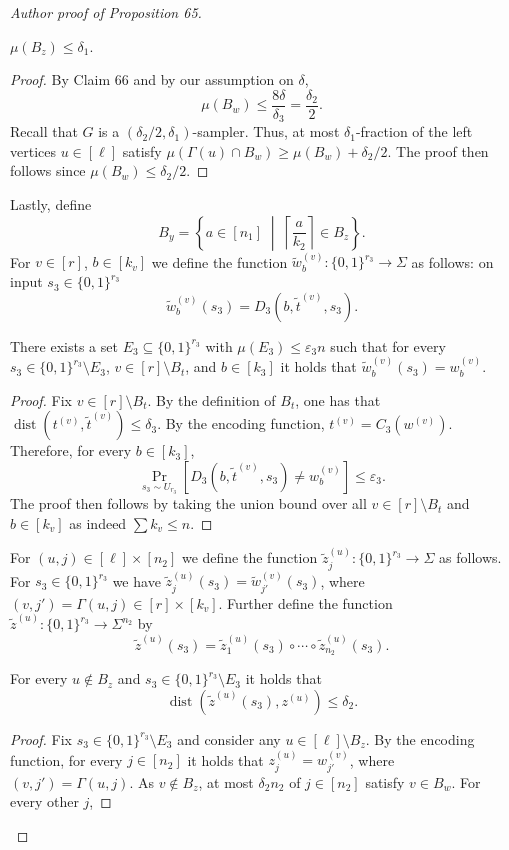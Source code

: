 \begin{proof}[Author proof of Proposition 65]
\begin{ntclaim} $\mu(B_z)\leq\delta_1$.\end{ntclaim}
\begin{proof}
By Claim 66 and by our assumption on $\delta$,
\[\mu(B_w)\leq\frac{8\delta}{\delta_3}=\frac{\delta_2}{2}.\]
Recall that $G$ is a $(\delta_2/2,\delta_1)$-sampler. Thus, at most $\delta_1$-fraction of the left vertices $u\in[\ell]$ satisfy $\mu(\Gamma(u)\cap B_w)\geq\mu(B_w)+\delta_2/2$. The proof then follows since $\mu(B_w)\leq\delta_2/2$.
\end{proof}
Lastly, define
\[B_y=\left\{a\in[n_1]\;\middle|\;\left\lceil\frac a{k_2}\right\rceil\in B_z\right\}.\]
For $v\in[r]$, $b\in[k_v]$ we define the function $\widetilde w_b^{(v)}:\{0,1\}^{r_3}\to\Sigma$ as follows: on input $s_3\in\{0,1\}^{r_3}$
\[\widetilde w_b^{(v)}(s_3)=D_3(b,\widetilde t^{(v)},s_3).\]
\begin{ntclaim}
There exists a set $E_3\subseteq\{0,1\}^{r_3}$ with $\mu(E_3)\leq\varepsilon_3n$ such that for every $s_3\in\{0,1\}^{r_3}\setminus E_3$, $v\in[r]\setminus B_t$, and $b\in[k_3]$ it holds that $\widetilde w_b^{(v)}(s_3)=w_b^{(v)}$.
\end{ntclaim}
\begin{proof}
Fix $v\in[r]\setminus B_t$. By the definition of $B_t$, one has that $\operatorname{dist}(t^{(v)},\widetilde t^{(v)})\leq\delta_3$. By the encoding function, $t^{(v)}=C_3(w^{(v)})$. Therefore, for every $b\in[k_3]$,
\[\Pr_{s_3\sim U_{r_3}}[D_3(b,\widetilde t^{(v)},s_3)\ne w_b^{(v)}]\leq\varepsilon_3.\]
The proof then follows by taking the union bound over all $v\in[r]\setminus B_t$ and $b\in[k_v]$ as indeed $\sum k_v\leq n$.
\end{proof}
For $(u,j)\in[\ell]\times[n_2]$ we define the function $\widetilde z_j^{(u)}:\{0,1\}^{r_3}\to\Sigma$ as follows. For $s_3\in\{0,1\}^{r_3}$ we have $\widetilde z_j^{(u)}(s_3)=\widetilde w_{j'}^{(v)}(s_3)$, where $(v,j')=\Gamma(u,j)\in[r]\times[k_v]$. Further define the function $\widetilde z^{(u)}:\{0,1\}^{r_3}\to\Sigma^{n_2}$ by
\[\widetilde z^{(u)}(s_3)=\widetilde z_1^{(u)}(s_3)\circ\cdots\circ\widetilde z_{n_2}^{(u)}(s_3).\]
\begin{ntclaim}
For every $u\notin B_z$ and $s_3\in\{0,1\}^{r_3}\setminus E_3$ it holds that
\[\operatorname{dist}(\widetilde z^{(u)}(s_3),z^{(u)})\leq\delta_2.\]
\end{ntclaim}
\begin{proof}
Fix $s_3\in\{0,1\}^{r_3}\setminus E_3$ and consider any $u\in[\ell]\setminus B_z$. By the encoding function, for every $j\in[n_2]$ it holds that $z_j^{(u)}=w_{j'}^{(v)}$, where $(v,j')=\Gamma(u,j)$. As $v\notin B_z$, at most $\delta_2n_2$ of $j\in[n_2]$ satisfy $v\in B_w$. For every other $j$,

\end{proof}
\end{proof}
